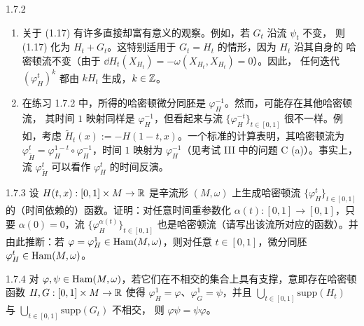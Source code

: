 \begin{wrem}{1.7.2}
\begin{enumerate}[label=(\roman*)]
  \item 关于 (1.17) 有许多直接却富有意义的观察。例如，若 $G_t$ 沿流 $\psi_t$ 不变，
        则 (1.17) 化为 $H_t+G_t$。这特别适用于 $G_t=H_t$ 的情形，因为 $H_t$ 沿其自身的
        哈密顿流不变（由于 $\dd H_t(X_{H_t})=-\omega(X_{H_t},X_{H_t})=0$）。因此，
        任何迭代 $(\varphi_H^t)^k$ 都由 $kH_t$ 生成，$k\in\mathbb{Z}$。
  \item 在练习 1.7.2 中，所得的哈密顿微分同胚是 $\varphi_H^{-1}$。然而，可能存在其他哈密顿流，
        其时间 $1$ 映射同样是 $\varphi_H^{-1}$，但看起来与流 $\{\varphi_H^{-t}\}_{t\in[0,1]}$
        很不一样。例如，考虑 $\widetilde H_t(x):=-H(1-t,x)$。一个标准的计算表明，其哈密顿流为
        $\varphi_{\widetilde H}^t=\varphi_H^{1-t}\circ\varphi_H^{-1}$，时间 $1$ 映射为
        $\varphi_H^{-1}$（见考试 III 中的问题 C (a)）。事实上，流 $\varphi_{\widetilde H}^t$
        可以看作 $\varphi_H^t$ 的时间反演。
\end{enumerate}
\end{wrem}

\begin{wexer}{1.7.3}
设 $H(t,x):[0,1]\times M\to\mathbb{R}$ 是辛流形 $(M,\omega)$ 上生成哈密顿流
$\{\varphi_H^t\}_{t\in[0,1]}$ 的（时间依赖的）函数。证明：对任意时间重参数化
$\alpha(t):[0,1]\to[0,1]$，只要 $\alpha(0)=0$，流 $\{\varphi_H^{\alpha(t)}\}_{t\in[0,1]}$
也是哈密顿流（请写出该流所对应的函数）。并由此推断：若
$\varphi=\varphi_H^1\in\operatorname{Ham}(M,\omega)$，则对任意 $t\in[0,1]$，微分同胚
$\varphi_H^t\in\operatorname{Ham}(M,\omega)$。
\end{wexer}

\begin{wexer}{1.7.4}
对 $\varphi,\psi\in\operatorname{Ham}(M,\omega)$，若它们在不相交的集合上具有支撑，意即存在哈密顿函数
$H,G:[0,1]\times M\to\mathbb{R}$ 使得 $\varphi_H^1=\varphi$、$\varphi_G^1=\psi$，并且
$\bigcup_{t\in[0,1]}\mathrm{supp}(H_t)$ 与 $\bigcup_{t\in[0,1]}\mathrm{supp}(G_t)$ 不相交，
则 $\varphi\psi=\psi\varphi$。
\end{wexer}

